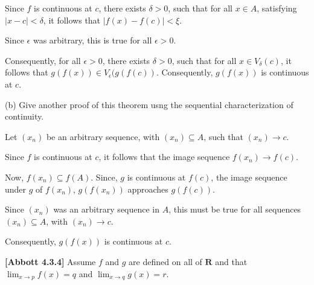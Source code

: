 \documentclass[10pt]{article}
\begin{document}
Since $\displaystyle f$ is continuous at $\displaystyle c$, there exists $\displaystyle \delta  >0$, such that for all $\displaystyle x\in A$, satisfying $\displaystyle |x-c|< \delta $, it follows that $\displaystyle |f( x) -f( c) |< \xi $.



Since $\displaystyle \epsilon $ was arbitrary, this is true for all $\displaystyle \epsilon  >0$.



Consequently, for all $\displaystyle \epsilon  >0$, there exists $\displaystyle \delta  >0$, such that for all $\displaystyle x\in V_{\delta }( c)$, it follows that $\displaystyle g( f( x)) \in V_{\epsilon }( g( f( c))$. Consequently, $\displaystyle g( f( x))$ is continuous at $\displaystyle c$.



(b) Give another proof of this theorem usng the sequential characterization of continuity.



Let $\displaystyle ( x_{n})$ be an arbitrary sequence, with $\displaystyle ( x_{n}) \subseteq A$, such that $\displaystyle ( x_{n})\rightarrow c$.



Since $\displaystyle f$ is continuous at $\displaystyle c$, it follows that the image sequence $\displaystyle f( x_{n})\rightarrow f( c)$.



Now, $\displaystyle f( x_{n}) \subseteq f( A)$. Since, $\displaystyle g$ is continuous at $\displaystyle f( c)$, the image sequence under $\displaystyle g$ of $\displaystyle f( x_{n})$, $\displaystyle g( f( x_{n}))$ approaches $\displaystyle g( f( c))$. 



Since $\displaystyle ( x_{n})$ was an arbitrary sequence in $\displaystyle A$, this must be true for all sequences $\displaystyle ( x_{n}) \subseteq A$, with $\displaystyle ( x_{n})\rightarrow c$.



Consequently, $\displaystyle g( f( x))$ is continuous at $\displaystyle c$.



\textbf{[Abbott 4.3.4] }Assume $\displaystyle f$ and $\displaystyle g$ are defined on all of $\displaystyle \mathbf{R}$ and that $\displaystyle \lim _{x\rightarrow p} f( x) =q$ and $\displaystyle \lim _{x\rightarrow q} g( x) =r$. 
\end{document}
